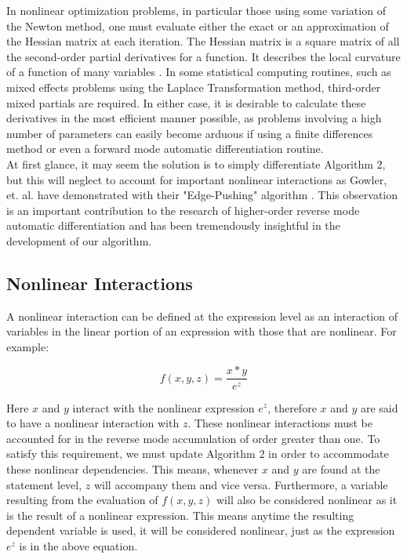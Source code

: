 \documentclass[oneside]{article}
\begin{document}
In nonlinear optimization problems, in particular those using some variation of the Newton method, one must evaluate either the exact or an approximation of the Hessian matrix at each iteration. The Hessian matrix is a square matrix of all the second-order partial derivatives for a function. It describes the local curvature of a function of many variables \cite{wiki_hessian}. In some statistical computing routines, such as mixed effects problems using the Laplace Transformation method, third-order mixed partials are required. In either case, it is desirable to calculate these derivatives in the most efficient manner possible, as problems involving a high number of parameters can easily become arduous if using a finite differences method or even a forward mode automatic differentiation routine. \\
At first glance, it may seem the solution is to simply differentiate Algorithm 2, but this will neglect to account for important nonlinear interactions as Gowler, et. al. have demonstrated with their "Edge-Pushing" algorithm \cite{gowler_ep}.  This observation is an important contribution to the research of higher-order reverse mode automatic differentiation and has been tremendously insightful in the development of our algorithm.



\subsection{Nonlinear Interactions}
A nonlinear interaction can be defined at the expression level as an interaction of variables in the linear portion of an expression with those that are nonlinear.  For example:

\begin{equation}
 f(x,y,z) = \frac{x*y}{e^z}
\end{equation}

Here $x$ and $y$ interact with the nonlinear expression $e^{z}$, therefore $x$ and $y$ are said to have a nonlinear interaction with $z$. These nonlinear interactions must be accounted for in the reverse mode accumulation of order greater than one. To satisfy this requirement, we must update Algorithm 2 in order to accommodate these nonlinear dependencies. This means, whenever $x$ and $y$ are found at the statement level, $z$ will accompany them and vice versa. Furthermore, a variable resulting from the evaluation of $f(x,y,z)$ will also be considered nonlinear as it is the result of a nonlinear expression. This means anytime the resulting dependent variable is used, it will be considered nonlinear, just as the expression $e^{z}$  is in the above equation.
\end{document}
